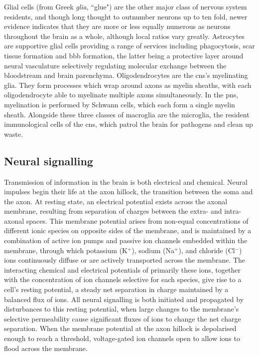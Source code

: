 Glial cells (from Greek \textit{glia}, ``glue") are the other major class of nervous system residents, and though long thought to outnumber neurons up to ten fold, newer evidence indicates that they are more or less equally numerous as neurons throughout the brain as a whole, although local ratios vary greatly.\autocite{Herculano-Houzel2014}
Astrocytes are supportive glial cells providing a range of services including phagocytosis, scar tissue formation and \gls{bbb} formation, the latter being a protective layer around neural vasculature selectively regulating molecular exchange between the bloodstream and brain parenchyma.
Oligodendrocytes are the \gls{cns}'s myelinating glia.
They form processes which wrap around axons as myelin sheaths, with each oligodendrocyte able to myelinate multiple axons simultaneously.
In the \gls{pns}, myelination is performed by Schwann cells, which each form a single myelin sheath.
Alongside these three classes of macroglia are the microglia, the resident immunological cells of the \gls{cns}, which patrol the brain for pathogens and clean up waste.

\subsection{Neural signalling}

Transmission of information in the brain is both electrical and chemical.
Neural impulses begin their life at the axon hillock, the transition between the soma and the axon.
At resting state, an electrical potential exists across the axonal membrane, resulting from separation of charges between the extra- and intra-axonal spaces.
This membrane potential arises from non-equal concentrations of different ionic species on opposite sides of the membrane, and is maintained by a combination of active ion pumps and passive ion channels embedded within the membrane, through which potassium (K$^+$), sodium (Na$^+$), and chloride (Cl$^-$) ions continuously diffuse or are actively transported across the membrane.
The interacting chemical and electrical potentials of primarily these ions, together with the concentration of ion channels selective for each species, give rise to a cell's resting potential, a steady net separation in charge maintained by a balanced flux of ions.
All neural signalling is both initiated and propagated by disturbances to this resting potential, when large changes to the membrane's selective permeability cause significant fluxes of ions to change the net charge separation.
When the membrane potential at the axon hillock is depolarised enough to reach a threshold, voltage-gated ion channels open to allow ions to flood across the membrane.

